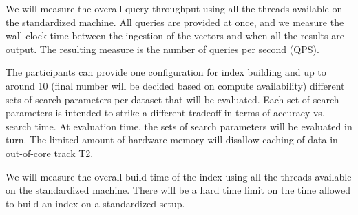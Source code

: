 



 We will measure the overall query
throughput using all the threads available on the standardized machine.
All queries are provided at once, and we measure the wall clock time
between the ingestion of the vectors and when all the results are
output. The resulting measure is the number of queries per second (QPS).




The participants can provide one configuration for index building and
up to around 10 (final number will be decided based on compute
availability) different sets of search parameters per dataset that
will be evaluated.  
Each set of search parameters is intended to
strike a different tradeoff in terms of accuracy vs. search time.  At
evaluation time, the sets of search parameters will be evaluated in
turn. The limited amount of hardware memory will disallow caching
of data in out-of-core track T2.



 We will measure the overall build time of
the index using all the threads available on the standardized machine. 
There will be a hard time limit on the time allowed to build an index on a standardized setup.

